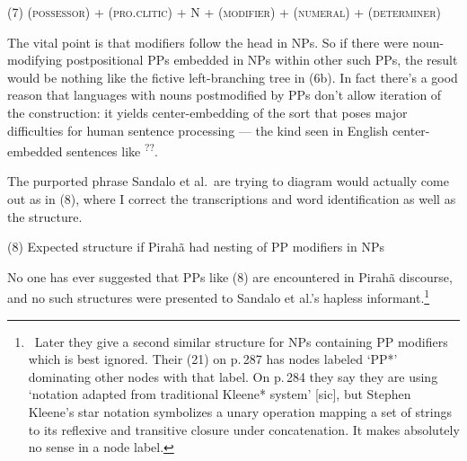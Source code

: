 \documentclass[output=paper,colorlinks,citecolor=brown
]{langscibook}
\begin{document}
\medskip\noindent
(7)\quad
(\textsc{possessor}) + (\textsc{pro.clitic}) + N + (\textsc{modifier})
+ (\textsc{numeral}) + (\textsc{determiner})

\medskip\noindent
The vital point is that modifiers follow the head in NPs. So if there
were noun-modifying postpositional PPs embedded in NPs within other
such PPs, the result would be nothing like the fictive left-branching
tree in (6b). In fact there's a good reason that languages with nouns
postmodified by PPs don't allow iteration of the construction: it
yields center-embedding of the sort that poses major difficulties for
human sentence processing --- the kind seen in English center-embedded
sentences like \textsuperscript{??}.

The purported phrase Sandalo et al.\ are trying to diagram would
actually come out as in (8), where I correct the transcriptions
and word identification as well as the structure.

\medskip\noindent
(8) Expected structure if Pirah{\~a} had nesting of PP modifiers in NPs

\nopagebreak[4]

\hspace*{2em}

\medskip\noindent
No one has ever suggested that PPs like (8) are encountered in Pirah{\~a}
discourse, and no such structures were presented to Sandalo et al.'s
hapless informant.\footnote{\,
   Later they give a second similar structure for NPs containing PP
   modifiers which is best ignored. Their (21) on p.\,287 has nodes
   labeled `PP*' dominating other nodes with that label. On p.\,284
   they say they are using `notation adapted from traditional Kleene*
   system' [sic], but Stephen Kleene's star notation symbolizes a
   unary operation mapping a set of strings to its reflexive and
   transitive closure under concatenation. It makes absolutely no
   sense in a node label.}
\end{document}
